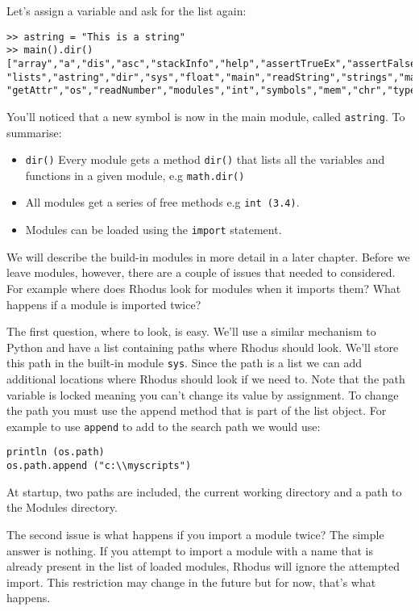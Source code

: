 Let's assign a variable and ask for the list again:

\begin{lstlisting}
>> astring = "This is a string"
>> main().dir()
["array","a","dis","asc","stackInfo","help","assertTrueEx","assertFalseEx",
"lists","astring","dir","sys","float","main","readString","strings","math",
"getAttr","os","readNumber","modules","int","symbols","mem","chr","type"]
\end{lstlisting}

You'll noticed that a new symbol is now in the main module, called {\tt astring}. To summarise:

\begin{itemize}
\item {\tt dir()} Every module gets a method {\tt dir()} that lists all the variables and functions in a given module, e.g {\tt math.dir()}
\item All modules get a series of free methods e.g {\tt int (3.4)}.
\item Modules can be loaded using the {\tt import} statement.
\end{itemize}

We will describe the build-in modules in more detail in a later chapter. Before we leave modules, however, there are a couple of issues that needed to considered. For example where does Rhodus look for modules when it imports them? What happens if a module is imported twice?

The first question, where to look, is easy. We'll use a similar mechanism to Python and have a list containing paths where Rhodus should look. We'll store this path in the built-in module {\tt sys}. Since the path is a list we can add additional locations where Rhodus should look if we need to. Note that the path variable is locked meaning you can't change its value by assignment. To change the path you must use the append method that is part of the list object. For example to use {\tt append} to add to the search path we would use:

\begin{lstlisting}
println (os.path)
os.path.append ("c:\\myscripts")
\end{lstlisting}

At startup, two paths are included, the current working directory and a path to the Modules directory.

The second issue is what happens if you import a module twice? The simple answer is nothing. If you attempt to import a module with a name that is already present in the list of loaded modules, Rhodus will ignore the attempted import. This restriction may change in the future but for now, that's what happens.

